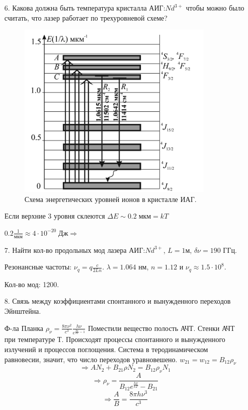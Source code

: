 \documentclass[a4paper]{article}
\begin{document}
\begin{itemize}
	\item[6.] Какова должна быть температура кристалла АИГ:$Nd^{3+}$ чтобы можно было считать, что лазер работает по трехуровневой схеме? \par 
		\begin{figure}[H]
			\begin{center}
				\includegraphics[scale=0.5]{sc1.png}
				\caption{Схема энергетических уровней ионов в кристалле ИАГ.}
				\label{sc1}
			\end{center}
		\end{figure}
		Если верхние 3 уровня склеются $\Delta E \sim 0.2 \; \text{мкм} = kT$ \par 
		$0.2 \frac{1}{\text{мкм}} \approx 4 \cdot 10^{-20} \; \text{Дж} \Rightarrow $
		\begin{center}
		\end{center}

	\item[7.] Найти кол-во продольных мод лазера АИГ:$Nd^{3+}$, $L = 1$м, $\delta \nu =  190$ ГГц. \par 
		Резонансные частоты: $\nu_q = q \frac{c}{2Ln}$. $\lambda = 1.064$ нм, $n = 1.12$ и $\nu_q \approx 1.5 \cdot 10^8$.\par 
		Кол-во мод: 1200.

	\item[8.] Связь между коэффициентами спонтанного и вынужденного переходов Эйнштейна. \par 		
		Ф-ла Планка $\rho_{\nu} = \frac{8 \pi \nu^2}{c^3} \frac{h \nu}{e^{\frac{h \nu}{kT}-1}} $
		Поместили вещество полость АЧТ. Стенки АЧТ при температуре Т. Происходят процессы спонтанного и вынужденного излучений и процессов поглощения.
		Система в теродинамическом равновесии, значит, что число переходов уравновешено. $w_{21} = w_{12} = B_{12} \rho_{\nu}$ 
		$$\Rightarrow AN_{2} + B_{21}\rho N_2 = B_{12}\rho_{\nu}N_1$$
		$$\Rightarrow \rho_{\nu} = \frac{A}{B_{12} e^{\frac{h \nu}{kT}} - B_{21}}$$
		$$\Rightarrow \frac{A}{B} = \frac{8 \pi h \nu^3}{c^3}$$


\end{itemize}
\end{document}
